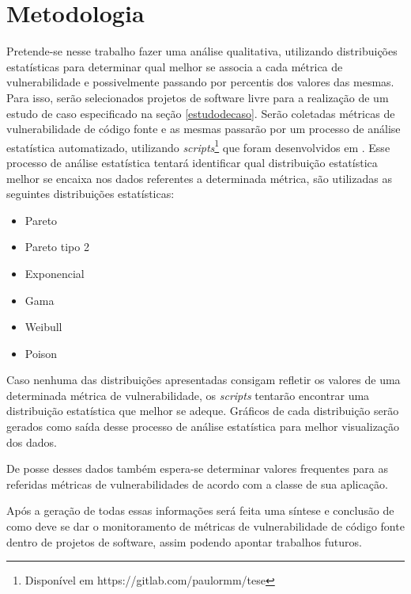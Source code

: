 \chapter{Metodologia}

Pretende-se nesse trabalho fazer uma análise qualitativa, utilizando distribuições estatísticas para determinar qual melhor
se associa a cada métrica de vulnerabilidade e possivelmente passando por percentis dos valores das mesmas. Para isso, serão
selecionados projetos de software livre para a realização de um estudo de caso especificado na seção \ref{estudodecaso}.
Serão coletadas métricas de vulnerabilidade de código fonte e as mesmas passarão por um processo de análise estatística
automatizado, utilizando \textit{scripts}\footnote{Disponível em https://gitlab.com/paulormm/tese} que foram desenvolvidos em 
\cite{meirelles2013}. Esse processo de análise estatística tentará identificar qual distribuição estatística melhor se encaixa 
nos dados referentes a determinada métrica, são utilizadas as seguintes distribuições estatísticas:

\begin{itemize}
  \item Pareto
  \item Pareto tipo 2
  \item Exponencial
  \item Gama
  \item Weibull
  \item Poison
\end{itemize}

Caso nenhuma das distribuições apresentadas consigam refletir os valores de uma determinada métrica de vulnerabilidade, os
\textit{scripts} tentarão encontrar uma distribuição estatística que melhor se adeque. Gráficos de cada distribuição serão
gerados como saída desse processo de análise estatística para melhor visualização dos dados.

De posse desses dados também espera-se determinar valores frequentes para as referidas métricas de vulnerabilidades de acordo
com a classe de sua aplicação.

Após a geração de todas essas informações será feita uma síntese e conclusão de como deve se dar o monitoramento de métricas de 
vulnerabilidade de código fonte dentro de projetos de software, assim podendo apontar trabalhos futuros.
